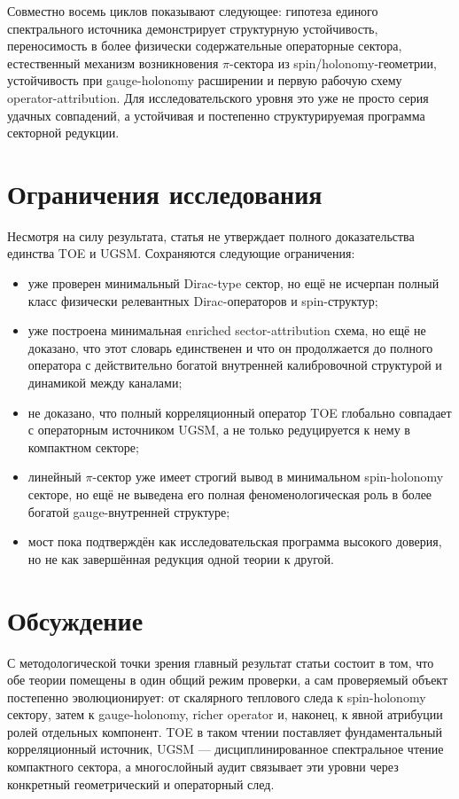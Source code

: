 \documentclass[12pt,a4paper]{article}
\begin{document}
Совместно восемь циклов показывают следующее: гипотеза единого спектрального источника демонстрирует структурную устойчивость, переносимость в более физически содержательные операторные сектора, естественный механизм возникновения \(\pi\)-сектора из spin/holonomy-геометрии, устойчивость при gauge-holonomy расширении и первую рабочую схему operator-attribution. Для исследовательского уровня это уже не просто серия удачных совпадений, а устойчивая и постепенно структурируемая программа секторной редукции.

\section{Ограничения исследования}

Несмотря на силу результата, статья не утверждает полного доказательства единства TOE и UGSM. Сохраняются следующие ограничения:
\begin{itemize}
    \item уже проверен минимальный Dirac-type сектор, но ещё не исчерпан полный класс физически релевантных Dirac-операторов и spin-структур;
    \item уже построена минимальная enriched sector-attribution схема, но ещё не доказано, что этот словарь единственен и что он продолжается до полного оператора с действительно богатой внутренней калибровочной структурой и динамикой между каналами;
    \item не доказано, что полный корреляционный оператор TOE глобально совпадает с операторным источником UGSM, а не только редуцируется к нему в компактном секторе;
    \item линейный \(\pi\)-сектор уже имеет строгий вывод в минимальном spin-holonomy секторе, но ещё не выведена его полная феноменологическая роль в более богатой gauge-внутренней структуре;
    \item мост пока подтверждён как исследовательская программа высокого доверия, но не как завершённая редукция одной теории к другой.
\end{itemize}

\section{Обсуждение}

С методологической точки зрения главный результат статьи состоит в том, что обе теории помещены в один общий режим проверки, а сам проверяемый объект постепенно эволюционирует: от скалярного теплового следа к spin-holonomy сектору, затем к gauge-holonomy, richer operator и, наконец, к явной атрибуции ролей отдельных компонент. TOE в таком чтении поставляет фундаментальный корреляционный источник, UGSM --- дисциплинированное спектральное чтение компактного сектора, а многослойный аудит связывает эти уровни через конкретный геометрический и операторный след.
\end{document}
